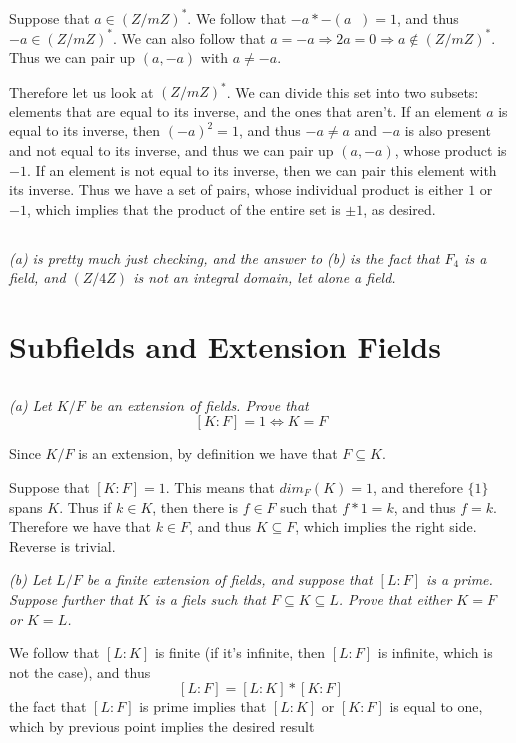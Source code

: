 \documentclass[11pt,oneside,titlepage]{book}
\DeclareMathOperator \inv {^{-1}}
\DeclareMathOperator \lra {\Leftrightarrow}
\DeclareMathOperator \ra {\Rightarrow}
\newcommand{\set}[1]{\{ #1 \}}
\begin{document}
Suppose that $a \in (Z/mZ)^*$. We follow that $-a * -(a\inv) = 1$, and
thus $-a \in (Z/mZ)^*$. We can also follow that $a = -a \ra 2a = 0 \ra
a \notin (Z/mZ)^*$. Thus we can pair up $(a, -a)$ with $a \neq -a$.

Therefore let us look at $(Z/mZ)^*$. We can divide this set into
two subsets: elements that are equal to its inverse, and the ones
that aren't. If an element $a$ is equal to its inverse, then
$(-a)^2 = 1$, and thus $-a \neq a$ and $-a$ is also present and not
equal to its inverse, and thus we can pair up $(a, -a)$, whose product
is $-1$. If an element is not equal to its inverse, then we can pair
this element with its inverse. Thus we have a set of pairs, whose
individual product is either $1$ or $-1$, which implies that the product
of the entire set is $\pm 1$, as desired.

\subsection{}

\textit{(a) is pretty much just checking, and the answer to (b) is the fact that
$F_4$ is a field, and $(Z/4Z)$ is not an integral domain, let alone a field.}

\section{Subfields and Extension Fields}

\subsection{}

\textit{(a) Let $K/F$ be an extension of fields. Prove that
  $$[K:F] = 1 \lra K = F$$
}

Since $K/F$ is an extension, by definition we have that $F \subseteq
K$.

Suppose that $[K:F] = 1$. This means that $dim_F(K) = 1$, and
therefore $\set{1}$ spans $K$. Thus if $k \in K$, then there is $f \in
F$ such that $f * 1 = k$, and thus $f = k$. Therefore we have that $k
\in F$, and thus $K \subseteq F$, which implies the right
side. Reverse is trivial.

\textit{(b) Let $L/F$ be a finite extension of fields, and suppose
that $[L:F]$ is a prime. Suppose further that $K$ is a fiels such that
$F \subseteq K \subseteq L$. Prove that either $K = F$ or $K = L$.}

We follow that $[L:K]$ is finite (if it's infinite, then $[L:F]$
is infinite, which is not the case), and thus
$$[L:F] = [L:K] * [K:F]$$
the fact that $[L:F]$ is prime implies that $[L:K]$ or $[K:F]$
is equal to one, which by previous point implies the desired result
\end{document}
